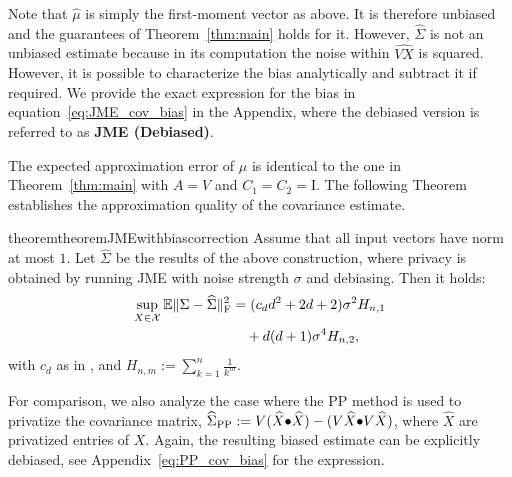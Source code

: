 Note that $\widehat\mu$ is simply the first-moment vector as above. It is therefore
unbiased and the guarantees of Theorem~\ref{thm:main} holds for it.
%
However, $\widehat\Sigma$ is not an unbiased estimate because in its computation
the noise within $\widehat{VX}$ is squared. 
%
However, it is possible to characterize the bias analytically and subtract it if required. 
%
We provide the exact expression for the bias in equation~\eqref{eq:JME_cov_bias} in the Appendix, where the debiased version is referred to as \textbf{JME (Debiased)}.

The expected approximation error of $\widehat\mu$ is identical to the one 
in Theorem~\ref{thm:main} with $A=V$ and $C_1=C_2=\text{I}$.
%
The following Theorem establishes the approximation quality of the covariance estimate. 

\begin{restatable}{theorem}{theoremJMEwithbiascorrection}
\label{thm:JME_error_with_bias_correction}
%
Assume that all input vectors have norm at most $1$. %
Let $\widehat{\Sigma}$ be the results of the above construction, where privacy is 
obtained by running JME with noise strength $\sigma$ and debiasing. Then it holds:
%
\begin{align}
\sup_{X \in \mathcal{X}}\mathbb{E}\|\Sigma - \widehat{\Sigma}\|_{\text{F}}^2 &= (c_d d^2 + 2d + 2)\sigma^2 H_{n, 1} 
\\&\quad+ d(d+1)\sigma^4 H_{n, 2}, \notag
\end{align}
with $c_d$ as in , and $H_{n, m} := \sum\limits_{k = 1}^{n} \frac{1}{k^m}$.
\end{restatable}

For comparison, we also analyze the case where the PP method is 
used to privatize the covariance matrix, $\widehat{\Sigma}_{\text{PP}} := V(\widehat{X} \operatorname{\!\bullet\!} \widehat{X}) - (V\widehat{X} \operatorname{\!\bullet\!} V\widehat{X})$, where $\widehat{X}$ are privatized entries of $X$.
%
Again, the resulting biased estimate can be explicitly debiased, see 
Appendix~\eqref{eq:PP_cov_bias} for the expression.

